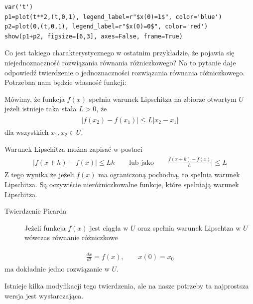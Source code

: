\documentclass[a4paper,12pt,polish]{sphinxmanual}
\begin{document}
\begin{verbatim}
var('t')
p1=plot(t**2,(t,0,1), legend_label=r"$x(0)=1$", color='blue')
p2=plot(0,(t,0,1), legend_label=r"$x(0)=0$", color='red')
show(p1+p2, figsize=[6,3], axes=False, frame=True)
\end{verbatim}


Co jest takiego charakterystycznego w ostatnim przykładzie, że pojawia się niejednoznaczność rozwiązania równania różniczkowego?  Na to pytanie daje odpowiedź  twierdzenie o jednoznaczności rozwiązania równania różniczkowego. Potrzebna nam będzie własność funkcji:

Mówimy, że funkcja $f(x)$ spełnia  warunek Lipschitza na zbiorze otwartym $U$ jeżeli istnieje taka stała $L > 0$,  że
\label{ch1/chI012:equation-eqn8}\begin{gather}
\begin{split}|f(x_2) -f(x_1)| \le L|x_2 - x_1|\end{split}\label{ch1/chI012-eqn8}
\end{gather}
dla wszystkich $x_1, x_2 \in U$.

Warunek Lipschitza można zapisać w postaci
\label{ch1/chI012:equation-eqn9}\begin{gather}
\begin{split}|f(x+h) -f(x)| \le L h \quad \quad \mbox{lub jako} \quad \quad \frac{f(x+h) - f(x)}{h}| \le L\end{split}\label{ch1/chI012-eqn9}
\end{gather}
Z tego wynika że jeżeli  $f(x)$ ma ograniczoną pochodną, to spełnia warunek Lipschitza. Są  oczywiście nieróżniczkowalne funkcje, które spełniają warunek Lipschitza.
\begin{description}
\item[{Twierdzenie Picarda}] \leavevmode
Jeżeli funkcja $f(x)$ jest ciągła w $U$ oraz spełnia warunek Lipschtza w  $U$ wówczas równanie różniczkowe

\end{description}
\label{ch1/chI012:equation-eqn10}\begin{gather}
\begin{split}\frac{dx}{dt} = f(x), \qquad x(0) = x_0\end{split}\label{ch1/chI012-eqn10}
\end{gather}
ma dokładnie jedno rozwiązanie w $U$.

Istnieje kilka  modyfikacji tego twierdzenia, ale na nasze potrzeby ta najprostsza wersja jest wystarczająca.
\end{document}
